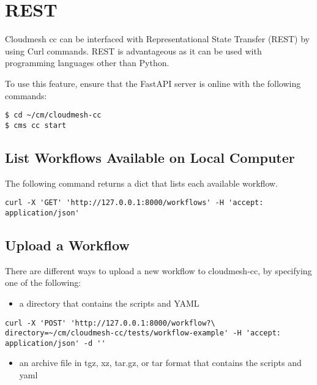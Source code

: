 
\section{REST}\label{rest}

Cloudmesh cc can be interfaced with Representational State Transfer
(REST) by using Curl commands. REST is advantageous as it can be used
with programming languages other than Python.

To use this feature, ensure that the FastAPI server is online with the
following commands:

\begin{verbatim}
$ cd ~/cm/cloudmesh-cc
$ cms cc start
\end{verbatim}

\subsection{List Workflows Available on Local
Computer}\label{list-workflows-available-on-local-computer}

The following command returns a dict that lists each available workflow.

\begin{verbatim}
curl -X 'GET' 'http://127.0.0.1:8000/workflows' -H 'accept: application/json'
\end{verbatim}

\subsection{Upload a Workflow}\label{upload-a-workflow}

There are different ways to upload a new workflow to cloudmesh-cc, by
specifying one of the following:

\smallskip
\begin{itemize}
\item
  a directory that contains the scripts and YAML
\end{itemize}

\begin{verbatim}
curl -X 'POST' 'http://127.0.0.1:8000/workflow?\
directory=~/cm/cloudmesh-cc/tests/workflow-example' -H 'accept: application/json' -d ''
\end{verbatim}
\smallskip

\smallskip
\begin{itemize}
\item
  an archive file in tgz, xz, tar.gz, or tar format that contains the
  scripts and yaml
\end{itemize}

